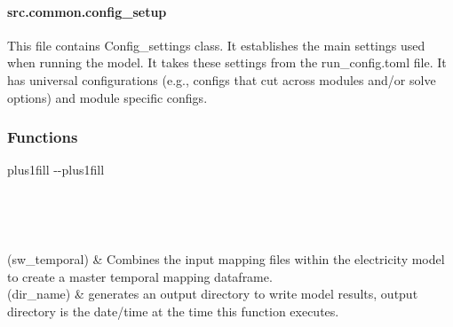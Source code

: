 \documentclass[letterpaper,10pt,english]{sphinxmanual}
\begin{document}
\sphinxstepscope


\paragraph{src.common.config\_setup}
\label{\detokenize{src.common.config_setup:module-src.common.config_setup}}\label{\detokenize{src.common.config_setup:src-common-config-setup}}\label{\detokenize{src.common.config_setup::doc}}
\sphinxAtStartPar
This file contains Config\_settings class. It establishes the main settings used when running
the model. It takes these settings from the run\_config.toml file. It has universal configurations
(e.g., configs that cut across modules and/or solve options) and module specific configs.
\subsubsection*{Functions}


\begin{savenotes}
\sphinxatlongtablestart
\sphinxthistablewithglobalstyle
\sphinxthistablewithnovlinesstyle
\makeatletter
  \LTleft \@totalleftmargin plus1fill
  \LTright\dimexpr\columnwidth-\@totalleftmargin-\linewidth\relax plus1fill
\makeatother
\begin{longtable}{}
\sphinxtoprule
\endfirsthead

\\
\sphinxtoprule
\endhead

\sphinxbottomrule
{}\\
\endfoot

\endlastfoot
\sphinxtableatstartofbodyhook

\sphinxAtStartPar
{}(sw\_temporal)
&
\sphinxAtStartPar
Combines the input mapping files within the electricity model to create a master temporal mapping dataframe.
\\
\sphinxhline
\sphinxAtStartPar
{}(dir\_name)
&
\sphinxAtStartPar
generates an output directory to write model results, output directory is the date/time at the time this function executes.
\\
\sphinxbottomrule
\end{longtable}
\sphinxtableafterendhook
\sphinxatlongtableend
\end{savenotes}
\end{document}
